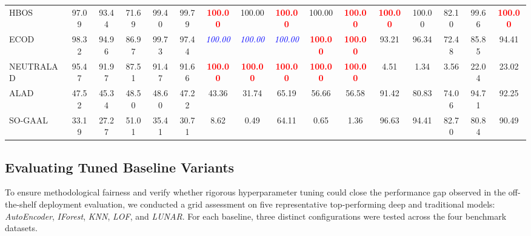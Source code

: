\documentclass[final,twocolumn,10pt]{elsarticle}
\begin{document}
\begin{table}[t]
{\begin{tabular}{l ccccc ccccc ccccc}
HBOS & 97.09 & 93.44 & 71.69 & 99.40 & 99.79 & \textcolor{red}{\textbf{100.00}} & 100.00 & \textcolor{red}{\textbf{100.00}} & 100.00 & \textcolor{red}{\textbf{100.00}} & \textcolor{red}{\textbf{100.00}} & 100.00 & 82.10 & 99.66 & \textcolor{red}{\textbf{100.00}} \\
ECOD & 98.32 & 94.96 & 86.97 & 99.73 & 97.44 & \textcolor{blue}{\textit{100.00}} & \textcolor{blue}{\textit{100.00}} & \textcolor{blue}{\textit{100.00}} & \textcolor{red}{\textbf{100.00}} & \textcolor{red}{\textbf{100.00}} & 93.21 & 96.34 & 72.48 & 85.85 & 94.41 \\
NEUTRALAD & 95.47 & 91.97 & 87.51 & 91.47 & 91.66 & \textcolor{red}{\textbf{100.00}} & \textcolor{red}{\textbf{100.00}} & \textcolor{red}{\textbf{100.00}} & \textcolor{red}{\textbf{100.00}} & \textcolor{red}{\textbf{100.00}} & 4.51 & 1.34 & 3.56 & 22.04 & 23.02 \\
ALAD & 47.52 & 45.34 & 48.50 & 48.60 & 47.22 & 43.36 & 31.74 & 65.19 & 56.66 & 56.58 & 91.42 & 80.83 & 74.06 & 94.71 & 92.25 \\
SO-GAAL & 33.19 & 27.27 & 51.01 & 35.41 & 30.71 & 8.62 & 0.49 & 64.11 & 0.65 & 1.36 & 96.63 & 94.41 & 82.70 & 80.84 & 90.49 \\
\bottomrule
\end{tabular}
}
\label{tab:anomaly_types_transposed}
\end{table}

\subsection{Evaluating Tuned Baseline Variants}
\label{ap2:tuned_baselines}


To ensure methodological fairness and verify whether rigorous hyperparameter tuning could close the performance gap observed in the off-the-shelf deployment evaluation, we conducted a grid assessment on five representative top-performing deep and traditional models: \textit{AutoEncoder}, \textit{IForest}, \textit{KNN}, \textit{LOF}, and \textit{LUNAR}. For each baseline, three distinct configurations were tested across the four benchmark datasets.
\end{document}
